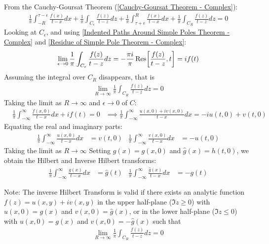 \documentclass[12pt, english]{book}
\makeatletter
\renewenvironment{proof}[1][\proofname]{\par
	\pushQED{\qed}%
	\normalfont \topsep6\p@\@plus6\p@\relax
	\list{}{%
		\settowidth{\leftmargin}{\itshape\proofname:\hskip\labelsep}%
		\setlength{\labelwidth}{0pt}%
		\setlength{\itemindent}{-\leftmargin}%
		}%
	\item[\hskip\labelsep\itshape#1\@addpunct{:}]\ignorespaces
	}{\popQED\endlist\@endpefalse}
\makeatother
\begin{document}
\begin{proof}
		From the Cauchy-Goursat Theorem (\cref{Cauchy-Goursat Theorem - Complex}):
		\begin{align*}
			\frac{1}{\pi} \int_{-R}^{\tau-\epsilon} \frac{f(x)}{t-x} dx
				+ \frac{1}{\pi} \int_{C_\epsilon} \frac{f(z)}{t - z} dz 
				+ \frac{1}{\pi} \int_{\tau+\epsilon}^{R} \frac{f(x)}{t - x} dx
				+ \frac{1}{\pi} \int_{C_R} \frac{f(z)}{t - z} dz = 0
		\end{align*}
		Looking at \(C_\epsilon\), and using \cref{Indented Paths Around Simple Poles Theorem - Complex} and \cref{Residue of Simple Pole Theorem - Complex}:
		\begin{align*}
			\lim_{\epsilon \rightarrow 0} \frac{1}{\pi} 
			\int_{C_\epsilon} \frac{f(z)}{t - z} dz 
			= - \frac{\pi i}{\pi} \Res[\frac{f(z)}{t - z}, t] = i f(t)
		\end{align*}
		Assuming the integral over \(C_R\) disappears, that is
		\begin{align*}
			\lim_{R\rightarrow \infty} \frac{1}{\pi} \int_{C_R} \frac{f(z)}{t - z} dz = 0
		\end{align*}
		Taking the limit as \(R \rightarrow \infty\) and \(\epsilon \rightarrow 0\) of \(C\):
		\begin{align*}
			&\frac{1}{\pi} \int_{-\infty}^{\infty} \frac{f(x, 0)}{t - x} dx + if(t) = 0
			&\implies \frac{1}{\pi} \int_{-\infty}^{\infty} \frac{u(x,0) + iv(x,0)}{t-x} dx
				= -iu(t, 0) + v(t, 0)
		\end{align*}
		Equating the real and imaginary parts:
		\begin{align*}
			\frac{1}{\pi} \int_{-\infty}^{\infty} \frac{u(x,0)}{t-x} dx &= v(t, 0)	&
			\frac{1}{\pi} \int_{-\infty}^{\infty} \frac{v(x,0)}{t-x} dx &= -u(t, 0)
		\end{align*}
		Taking the limit as \(R \rightarrow \infty\)
		Setting \(g(x) = g(x, 0)\) and \(\hat{g}(x) = h(t, 0)\), we obtain the Hilbert and Inverse Hilbert transforms:
		\begin{align*}
			\frac{1}{\pi} \int_{-\infty}^{\infty} \frac{g(x)}{t-x} dx &= \hat{g}(t)	&
			\frac{1}{\pi} \int_{-\infty}^{\infty} \frac{\hat{g}(x)}{t-x} dx &= -g(t)
		\end{align*}
	\end{proof}

	Note: The inverse Hilbert Transform is valid if there exists an analytic function \(f(z) = u(x,y) + iv(x,y)\) in the upper half-plane (\(\Im{z} \geq 0\)) with \(u(x, 0) = g(x)\) and \(v(x,0) = \hat{g}(x)\), or in the lower half-plane (\(\Im{z} \leq 0\)) with \(u(x,0) = g(x)\) and \(v(x,0) = -\hat{g}(x)\) such that 
	\begin{align*}
	 	\lim_{R \rightarrow \infty} \frac{1}{\pi} \int_{C_R} \frac{f(z)}{t - z} dz = 0
	\end{align*}
\end{document}
